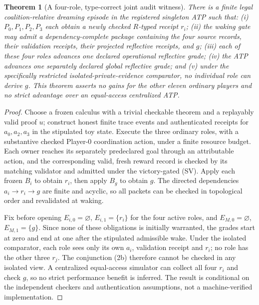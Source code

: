 \documentclass[11pt,letterpaper]{article}
\theoremstyle{definition}
\theoremstyle{plain}
\newtheorem{theorem}[definition]{Theorem}
\theoremstyle{definition}
\begin{document}
\begin{theorem}[A four-role, type-correct joint audit witness]
There is a finite legal coalition-relative dreaming episode in the registered singleton ATP such that: (i) $P_0,P_1,P_2,P_3$ each obtain a newly checked $R$-typed receipt $r_i$; (ii) the waking gate may admit a dependency-complete package containing the four source records, their validation receipts, their projected reflective receipts, and $g$; (iii) each of these \emph{four} roles advances one \emph{declared operational} reflective grade; (iv) the ATP advances one separately declared global reflective grade; and (v) under the specifically restricted isolated-private-evidence comparator, no individual role can derive $g$. This theorem asserts no gains for the other eleven ordinary players and no strict advantage over an equal-access centralized ATP.
\end{theorem}
\begin{proof}
Choose a frozen calculus with a trivial checkable theorem and a replayably valid proof $u$; construct honest finite trace events and authenticated receipts for $a_0,a_2,a_3$ in the stipulated toy state. Execute the three ordinary roles, with a substantive checked Player-0 coordination action, under a finite resource budget. Each owner reaches its separately predeclared goal through an attributable action, and the corresponding valid, fresh reward record is checked by its matching validator and admitted under the victory-gated (SV). Apply each frozen $B_i$ to obtain $r_i$, then apply $B_g$ to obtain $g$. The directed dependencies $a_i\to r_i\to g$ are finite and acyclic, so all packets can be checked in topological order and revalidated at waking.

Fix before opening $E_{i,0}=\varnothing$, $E_{i,1}=\{r_i\}$ for the four active roles, and $E_{M,0}=\varnothing$, $E_{M,1}=\{g\}$. Since none of these obligations is initially warranted, the grades start at zero and end at one after the stipulated admissible wake. Under the isolated comparator, each role sees only its own $a_i$, validation receipt and $r_i$; no role has the other three $r_j$. The conjunction (2b) therefore cannot be checked in any isolated view. A centralized equal-access simulator can collect all four $r_i$ and check $g$, so no strict performance benefit is inferred. The result is conditional on the independent checkers and authentication assumptions, not a machine-verified implementation.
\end{proof}
\end{document}
